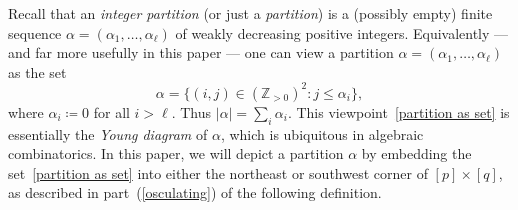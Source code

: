 \documentclass[noamsfonts,10pt]{amsart}
\newcommand{\al}{\alpha}
\newcommand{\1}{\mathbf{1}}
\theoremstyle{plain}
\theoremstyle{definition}
\numberwithin{equation}{section}
\begin{document}
Recall that an \emph{integer partition} (or just a \emph{partition}) is a (possibly empty) finite sequence $\al = (\al_1, \ldots, \al_\ell)$ of weakly decreasing positive integers.
Equivalently --- and far more usefully in this paper --- one can view a partition $\al = (\al_1, \ldots, \al_\ell)$ as the set
\begin{equation}
    \label{partition as set}
    \al = \Big\{ (i,j) \in (\mathbb{Z}_{>0})^2 : j \leq \al_i \Big\},
\end{equation}
where $\al_i \coloneqq 0$ for all $i > \ell$.
Thus $|\al| = \sum_i \al_i$.
This viewpoint~\eqref{partition as set} is essentially the \emph{Young diagram} of $\al$, which is ubiquitous in algebraic combinatorics.
In this paper, we will depict a partition $\al$ by embedding the set~\eqref{partition as set} into either the northeast or southwest corner of $[p] \times [q]$, as described in part~(\ref{osculating}) of the following definition.
\end{document}
